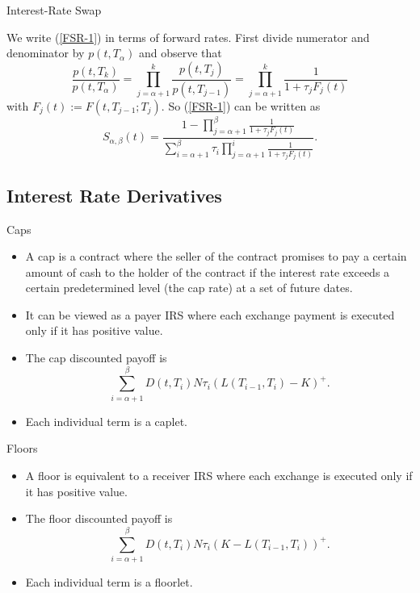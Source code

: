{Interest-Rate Swap}

We write (\ref{FSR-1}) in terms of forward rates. First divide numerator
and denominator by $p(t,T_{\alpha})$ and observe that
$$
\frac{p(t,T_k)}{p(t,T_{\alpha})}=
\prod_{j=\alpha+1}^k\frac{p(t,T_j)}{p(t,T_{j-1})}=
\prod_{j=\alpha+1}^k\frac{1}{1+\tau_jF_j(t)}$$
with $F_j(t):=F(t,T_{j-1};T_j)$. So (\ref{FSR-1}) can be written as
\begin{equation}
S_{\alpha,\beta}(t)=
\frac{1-\prod_{j=\alpha+1}^{\beta}\frac{1}{1+\tau_jF_j(t)}}
{\sum_{i=\alpha+1}^{\beta}\tau_i\prod_{j=\alpha+1}^{i}\frac{1}{1+\tau_jF_j(t)}}.
\end{equation}

\subsection{Interest Rate Derivatives}

{Caps}
\begin{itemize}
\item<1->
A cap is a contract where the seller of the contract promises to
pay a certain amount of cash to the holder of the contract if the
interest rate exceeds a certain predetermined level (the cap rate)
at a set of future dates.
\item<2->It can be viewed as a payer IRS where
each exchange payment is executed only if it has positive value.
\item<3->The cap discounted payoff is
$$
\sum_{i=\alpha+1}^{\beta}D(t,T_i)N\tau_i(L(T_{i-1},T_i)-K)^+.
$$
\item<4->Each individual term is a caplet.
\end{itemize}


{Floors}
\begin{itemize}
\item<1->A floor is
equivalent to a receiver IRS where each exchange is executed only
if it has positive value.
\item<2->
The floor discounted payoff is
$$
\sum_{i=\alpha+1}^{\beta}D(t,T_i)N\tau_i(K-L(T_{i-1},T_i))^+.
$$
\item<3->Each individual term is a floorlet.
\end{itemize}





